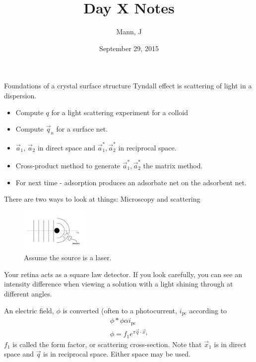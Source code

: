 \documentclass{article}
\author{Mann, J}
\title{Day X Notes}
\date{September 29, 2015}
\newcommand{\aOne}[0]{\vec{a}_1}
\newcommand{\aTwo}[0]{\vec{a}_2}
\begin{document}
\maketitle{}
\begin{section}{Foundations of a crystal surface structure}
	Tyndall effect is scattering of light in a dispersion.
	\begin{itemize}
		\item Compute $q$ for a light scattering experiment for a colloid
		\item Compute $\vec{q}_n$ for a surface net.
		\item $\aOne$, $\aTwo$ in direct space and $\aOne^\ast,\aTwo^\ast$ in reciprocal space.
		\item Cross-product method to generate $\aOne^\ast,\aTwo^\ast$ the matrix method.
		\item For next time - adsorption produces an adsorbate net on the adsorbent net.
	\end{itemize}
	There are two ways to look at things: Microscopy and scattering
\end{section}
\begin{section}{}
	\begin{figure}[h]
		\centering
		\includegraphics[height=60pt]{atomWave}
		\caption{Assume the source is a laser.}
		\label{fig:laser}
	\end{figure}

	Your retina acts as a square law detector. If you look carefully, you can see an intensity difference when viewing a solution with a light shining through at different angles.

	An electric field, $\phi$ is converted (often to a photocurrent, $i_\text{pc}$ according to 
	\begin{align*}
		\phi\ast\phi \alpha i_\text{pc}\\
		\phi = f_1 e^{\pi \vec{q}\cdot\vec{x}_1}
	\end{align*}
	$f_1$ is called the form factor, or scattering cross-section. Note that $\vec{x}_1$ is in direct space and $\vec{q}$ is in reciprocal space. Either space may be used.

	\end{section}
\end{document}
